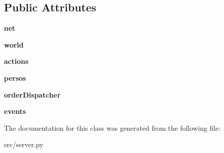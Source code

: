 \subsection*{\-Public \-Attributes}
\begin{DoxyCompactItemize}
\item 
\hypertarget{classsrc_1_1server_1_1_server_a977f367c00160406f296db24527ca2e4}{{\bfseries net}}\label{classsrc_1_1server_1_1_server_a977f367c00160406f296db24527ca2e4}

\item 
\hypertarget{classsrc_1_1server_1_1_server_a81234f26dc57f2224a44ae02da905c35}{{\bfseries world}}\label{classsrc_1_1server_1_1_server_a81234f26dc57f2224a44ae02da905c35}

\item 
\hypertarget{classsrc_1_1server_1_1_server_add29ef3b0aee842a0d8f853b2ea26ad2}{{\bfseries actions}}\label{classsrc_1_1server_1_1_server_add29ef3b0aee842a0d8f853b2ea26ad2}

\item 
\hypertarget{classsrc_1_1server_1_1_server_a12052b5f5cfbc0e1daf37799685e8879}{{\bfseries persos}}\label{classsrc_1_1server_1_1_server_a12052b5f5cfbc0e1daf37799685e8879}

\item 
\hypertarget{classsrc_1_1server_1_1_server_afcc520c8d960ee0208dd35d6e4f68dfe}{{\bfseries order\-Dispatcher}}\label{classsrc_1_1server_1_1_server_afcc520c8d960ee0208dd35d6e4f68dfe}

\item 
\hypertarget{classsrc_1_1server_1_1_server_ab7c18709ca5293c140d26000f3828ecc}{{\bfseries events}}\label{classsrc_1_1server_1_1_server_ab7c18709ca5293c140d26000f3828ecc}

\end{DoxyCompactItemize}


\-The documentation for this class was generated from the following file\-:\begin{DoxyCompactItemize}
\item 
src/server.\-py\end{DoxyCompactItemize}
